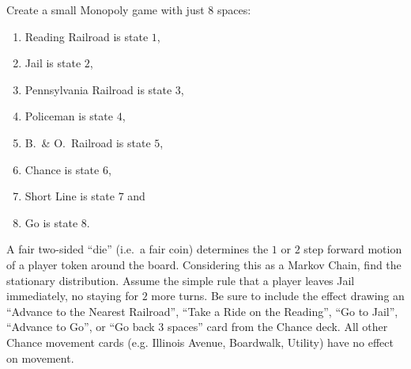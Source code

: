\documentclass[12pt]{article}
\begin{document}
\begin{exercise}
    Create a small Monopoly game with just \( 8 \) spaces:
    \begin{enumerate}
        \item
            Reading Railroad is state \( 1 \),
        \item
            Jail is state \( 2 \),
        \item
            Pennsylvania Railroad is state \( 3 \),
        \item
            Policeman is state \( 4 \),
        \item
            B.\ \& O.\ Railroad is state \( 5 \),
        \item
            Chance is state \( 6 \),
        \item
            Short Line is state \( 7 \) and
        \item
            Go is state \( 8 \).
    \end{enumerate}
    A fair two-sided ``die'' (i.e.\ a fair coin) determines the \( 1 \)
    or \( 2 \) step forward motion of a player token around the board.
    Considering this as a Markov Chain, find the stationary
    distribution.  Assume the simple rule that a player leaves Jail
    immediately, no staying for \( 2 \) more turns.  Be sure to include
    the effect drawing an ``Advance to the Nearest Railroad'', ``Take a
    Ride on the Reading'', ``Go to Jail'', ``Advance to Go'', or ``Go
    back \( 3 \) spaces'' card from the Chance deck.  All other Chance
    movement cards (e.g. Illinois Avenue, Boardwalk, Utility) have no
    effect on movement.
\end{exercise}
\end{document}
